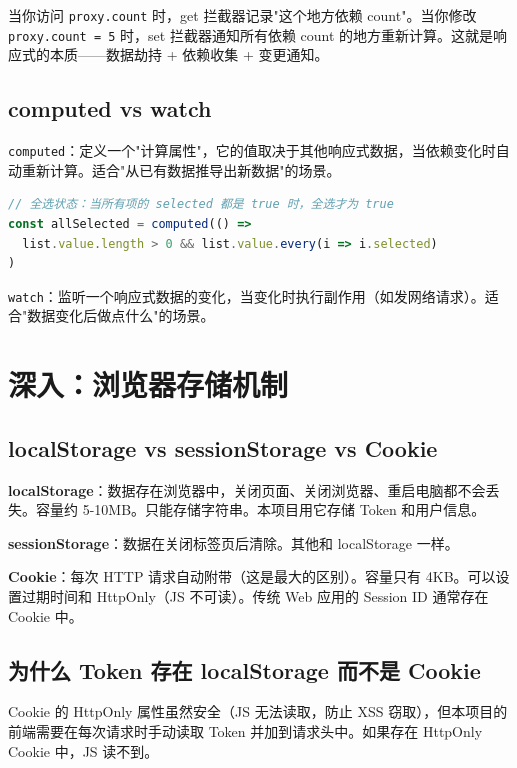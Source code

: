 \documentclass[12pt,a4paper]{ctexart}
\begin{document}
当你访问 \texttt{proxy.count} 时，get 拦截器记录"这个地方依赖 count"。当你修改 \texttt{proxy.count = 5} 时，set 拦截器通知所有依赖 count 的地方重新计算。这就是响应式的本质——数据劫持 + 依赖收集 + 变更通知。

\subsection{computed vs watch}

\texttt{computed}：定义一个"计算属性"，它的值取决于其他响应式数据，当依赖变化时自动重新计算。适合"从已有数据推导出新数据"的场景。

\begin{lstlisting}[language=JavaScript]
// 全选状态：当所有项的 selected 都是 true 时，全选才为 true
const allSelected = computed(() =>
  list.value.length > 0 && list.value.every(i => i.selected)
)
\end{lstlisting}

\texttt{watch}：监听一个响应式数据的变化，当变化时执行副作用（如发网络请求）。适合"数据变化后做点什么"的场景。

\section{深入：浏览器存储机制}

\subsection{localStorage vs sessionStorage vs Cookie}

\textbf{localStorage}：数据存在浏览器中，关闭页面、关闭浏览器、重启电脑都不会丢失。容量约 5-10MB。只能存储字符串。本项目用它存储 Token 和用户信息。

\textbf{sessionStorage}：数据在关闭标签页后清除。其他和 localStorage 一样。

\textbf{Cookie}：每次 HTTP 请求自动附带（这是最大的区别）。容量只有 4KB。可以设置过期时间和 HttpOnly（JS 不可读）。传统 Web 应用的 Session ID 通常存在 Cookie 中。

\subsection{为什么 Token 存在 localStorage 而不是 Cookie}

Cookie 的 HttpOnly 属性虽然安全（JS 无法读取，防止 XSS 窃取），但本项目的前端需要在每次请求时手动读取 Token 并加到请求头中。如果存在 HttpOnly Cookie 中，JS 读不到。
\end{document}
